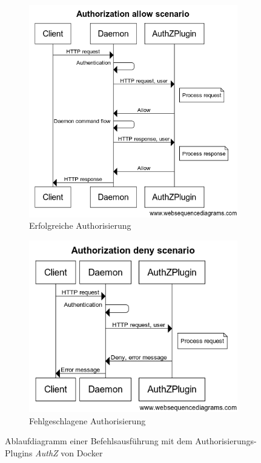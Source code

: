 \documentclass[../main.tex]{subfiles}
\begin{document}
    \begin{figure}
      \centering
      \begin{subfigure}{.5\textwidth}
        \centering
        \includegraphics[width=1.0\linewidth]{./images/sec_authzAllow.png}
        \caption{Erfolgreiche Authorisierung}
        \label{fig:sec_authzAllow}
      \end{subfigure}%
      \begin{subfigure}{.5\textwidth}
        \centering
        \includegraphics[width=1.0\linewidth]{./images/sec_authzDeny.png}
        \caption{Fehlgeschlagene Authorisierung}
        \label{fig:sec_authzDeny}
      \end{subfigure}
      \caption{Ablaufdiagramm einer Befehlsausführung mit dem Authorisierungs-Plugins \emph{AuthZ} von Docker}
      \label{fig:sec_authz}
    \end{figure}
\end{document}
